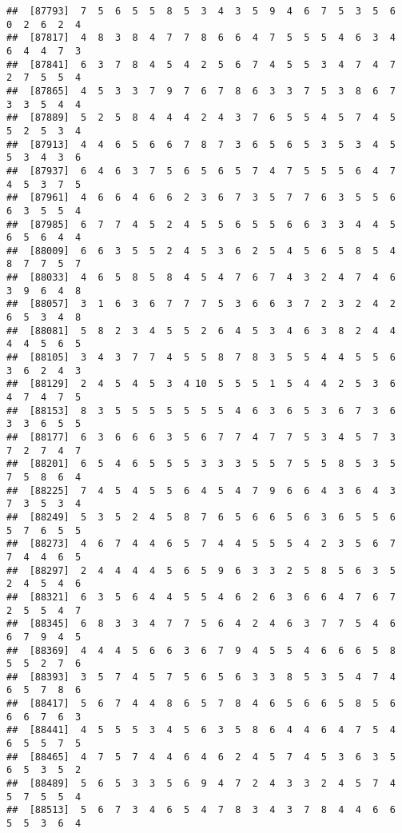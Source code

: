 \documentclass[
]{book}
\begin{document}
\begin{verbatim}
##  [87793]  7  5  6  5  5  8  5  3  4  3  5  9  4  6  7  5  3  5  6  0  2  6  2  4
##  [87817]  4  8  3  8  4  7  7  8  6  6  4  7  5  5  5  4  6  3  4  6  4  4  7  3
##  [87841]  6  3  7  8  4  5  4  2  5  6  7  4  5  5  3  4  7  4  7  2  7  5  5  4
##  [87865]  4  5  3  3  7  9  7  6  7  8  6  3  3  7  5  3  8  6  7  3  3  5  4  4
##  [87889]  5  2  5  8  4  4  4  2  4  3  7  6  5  5  4  5  7  4  5  5  2  5  3  4
##  [87913]  4  4  6  5  6  6  7  8  7  3  6  5  6  5  3  5  3  4  5  5  3  4  3  6
##  [87937]  6  4  6  3  7  5  6  5  6  5  7  4  7  5  5  5  6  4  7  4  5  3  7  5
##  [87961]  4  6  6  4  6  6  2  3  6  7  3  5  7  7  6  3  5  5  6  6  3  5  5  4
##  [87985]  6  7  7  4  5  2  4  5  5  6  5  5  6  6  3  3  4  4  5  6  5  6  4  4
##  [88009]  6  6  3  5  5  2  4  5  3  6  2  5  4  5  6  5  8  5  4  8  7  7  5  7
##  [88033]  4  6  5  8  5  8  4  5  4  7  6  7  4  3  2  4  7  4  6  3  9  6  4  8
##  [88057]  3  1  6  3  6  7  7  7  5  3  6  6  3  7  2  3  2  4  2  6  5  3  4  8
##  [88081]  5  8  2  3  4  5  5  2  6  4  5  3  4  6  3  8  2  4  4  4  4  5  6  5
##  [88105]  3  4  3  7  7  4  5  5  8  7  8  3  5  5  4  4  5  5  6  3  6  2  4  3
##  [88129]  2  4  5  4  5  3  4 10  5  5  5  1  5  4  4  2  5  3  6  4  7  4  7  5
##  [88153]  8  3  5  5  5  5  5  5  5  4  6  3  6  5  3  6  7  3  6  3  3  6  5  5
##  [88177]  6  3  6  6  6  3  5  6  7  7  4  7  7  5  3  4  5  7  3  7  2  7  4  7
##  [88201]  6  5  4  6  5  5  5  3  3  3  5  5  7  5  5  8  5  3  5  7  5  8  6  4
##  [88225]  7  4  5  4  5  5  6  4  5  4  7  9  6  6  4  3  6  4  3  7  3  5  3  4
##  [88249]  5  3  5  2  4  5  8  7  6  5  6  6  5  6  3  6  5  5  6  5  7  6  5  5
##  [88273]  4  6  7  4  4  6  5  7  4  4  5  5  5  4  2  3  5  6  7  7  4  4  6  5
##  [88297]  2  4  4  4  4  5  6  5  9  6  3  3  2  5  8  5  6  3  5  2  4  5  4  6
##  [88321]  6  3  5  6  4  4  5  5  4  6  2  6  3  6  6  4  7  6  7  2  5  5  4  7
##  [88345]  6  8  3  3  4  7  7  5  6  4  2  4  6  3  7  7  5  4  6  6  7  9  4  5
##  [88369]  4  4  4  5  6  6  3  6  7  9  4  5  5  4  6  6  6  5  8  5  5  2  7  6
##  [88393]  3  5  7  4  5  7  5  6  5  6  3  3  8  5  3  5  4  7  4  6  5  7  8  6
##  [88417]  5  6  7  4  4  8  6  5  7  8  4  6  5  6  6  5  8  5  6  6  6  7  6  3
##  [88441]  4  5  5  5  3  4  5  6  3  5  8  6  4  4  6  4  7  5  4  6  5  5  7  5
##  [88465]  4  7  5  7  4  4  6  4  6  2  4  5  7  4  5  3  6  3  5  6  5  3  5  2
##  [88489]  5  6  5  3  3  5  6  9  4  7  2  4  3  3  2  4  5  7  4  5  7  5  5  4
##  [88513]  5  6  7  3  4  6  5  4  7  8  3  4  3  7  8  4  4  6  6  5  5  3  6  4

\end{verbatim}
\end{document}
